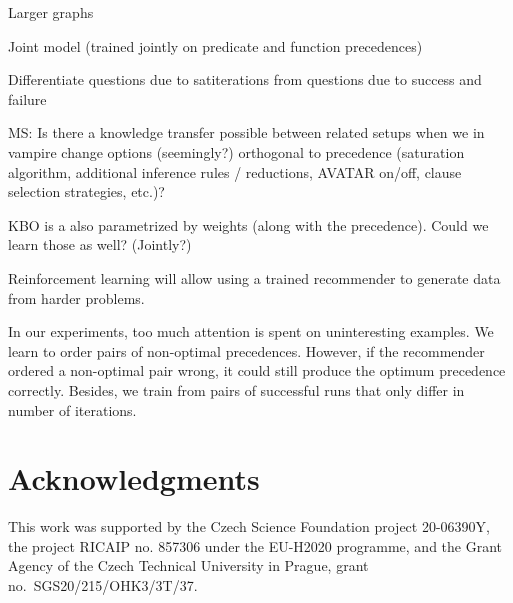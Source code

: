 \documentclass[runningheads]{llncs}
\begin{document}
Larger graphs

Joint model (trained jointly on predicate and function precedences)

Differentiate questions due to satiterations from questions due to success and failure

MS: Is there a knowledge transfer possible between related setups when we in vampire change
options (seemingly?) orthogonal to precedence (saturation algorithm, additional inference rules / reductions, AVATAR on/off,
clause selection strategies, etc.)?

KBO is a also parametrized by weights (along with the precedence). Could we learn those as well? (Jointly?)

Reinforcement learning will allow using a trained recommender to generate data from harder problems.

In our experiments, too much attention is spent on uninteresting examples.
We learn to order pairs of non-optimal precedences.
However, if the recommender ordered a non-optimal pair wrong, it could still produce the optimum precedence correctly.
Besides, we train from pairs of successful runs that only differ in number of iterations.

\section*{Acknowledgments}



This work was supported by
the Czech Science Foundation project 20-06390Y,
the project RICAIP no. 857306 under the EU-H2020 programme,
and
the Grant Agency of the Czech Technical University in Prague, grant\\
no.~SGS20/215/OHK3/3T/37.





\appendix
\end{document}
